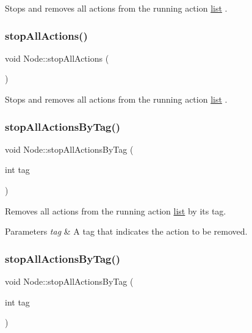 Stops and removes all actions from the running action \hyperlink{protocollist-p}{list} . \mbox{\label{classNode_a1d542784d864cffe325e9e32d180aa6d}} 
\subsubsection{\texorpdfstring{stop\+All\+Actions()}{stopAllActions()}\hspace{0.1cm}{\footnotesize\ttfamily [2/2]}}
{\footnotesize\ttfamily void Node\+::stop\+All\+Actions (\begin{DoxyParamCaption}{ }\end{DoxyParamCaption})}

Stops and removes all actions from the running action \hyperlink{protocollist-p}{list} . \mbox{\label{classNode_a70f8518979a58094c1ed2dbbe7ebcb9f}} 
\subsubsection{\texorpdfstring{stop\+All\+Actions\+By\+Tag()}{stopAllActionsByTag()}\hspace{0.1cm}{\footnotesize\ttfamily [1/2]}}
{\footnotesize\ttfamily void Node\+::stop\+All\+Actions\+By\+Tag (\begin{DoxyParamCaption}\item[{int}]{tag }\end{DoxyParamCaption})}

Removes all actions from the running action \hyperlink{protocollist-p}{list} by its tag.


\begin{DoxyParams}{Parameters}
{\em tag} & A tag that indicates the action to be removed. \\
\hline
\end{DoxyParams}
\mbox{\label{classNode_a70f8518979a58094c1ed2dbbe7ebcb9f}} 
\subsubsection{\texorpdfstring{stop\+All\+Actions\+By\+Tag()}{stopAllActionsByTag()}\hspace{0.1cm}{\footnotesize\ttfamily [2/2]}}
{\footnotesize\ttfamily void Node\+::stop\+All\+Actions\+By\+Tag (\begin{DoxyParamCaption}\item[{int}]{tag }\end{DoxyParamCaption})}

